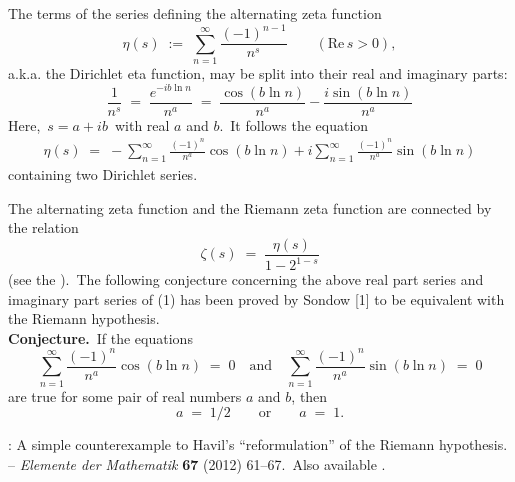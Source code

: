 \documentclass[12pt]{article}
\theoremstyle{definition}
\begin{document}
The terms of the series defining the alternating zeta function
$$\eta(s) \;:=\; \sum_{n=1}^{\infty}\frac{(-1)^{n-1}}{n^s} \qquad (\mbox{Re}\,s > 0),$$
a.k.a. the Dirichlet eta function, may be split into their real and imaginary parts:
$$\frac{1}{n^s} \;=\; \frac{e^{-ib\ln{n}}}{n^a} \;=\; 
\frac{\cos(b\ln{n})}{n^a}-\frac{i\sin(b\ln{n})}{n^a}$$
Here,\, $s = a\!+\!ib$\, with real $a$ and $b$.\, It follows the equation
\begin{align}
\eta(s) \;=\; 
-\sum_{n=1}^\infty\frac{(-1)^n}{n^a}\cos(b\ln{n})+i\sum_{n=1}^\infty\frac{(-1)^n}{n^a}\sin(b\ln{n})
\end{align}
containing two Dirichlet series.

The alternating zeta function and the Riemann zeta function are connected by the relation
$$\zeta(s) \;=\; \frac{\eta(s)}{1-2^{1-s}}$$
(see the ).\, The following conjecture concerning the above real part series and imaginary part series of (1) has been proved by Sondow [1] to be equivalent with the Riemann hypothesis.\\

\textbf{Conjecture.}\, If the equations
$$\sum_{n=1}^\infty\frac{(-1)^n}{n^a}\cos(b\ln{n}) \;=\; 0 \quad \mbox{and} \quad 
\sum_{n=1}^\infty\frac{(-1)^n}{n^a}\sin(b\ln{n}) \;=\; 0$$
are true for some pair of real numbers $a$ and $b$, then
$$a \;=\; 1/2 \qquad \mbox{or} \qquad a \;=\; 1.$$

\begin{thebibliography}{8}
: A simple counterexample to Havil's ``reformulation'' of the Riemann hypothesis.\, -- {\it Elemente der Mathematik} \textbf{67} (2012) 61--67.\, Also available .
\end{thebibliography}

\end{document}
